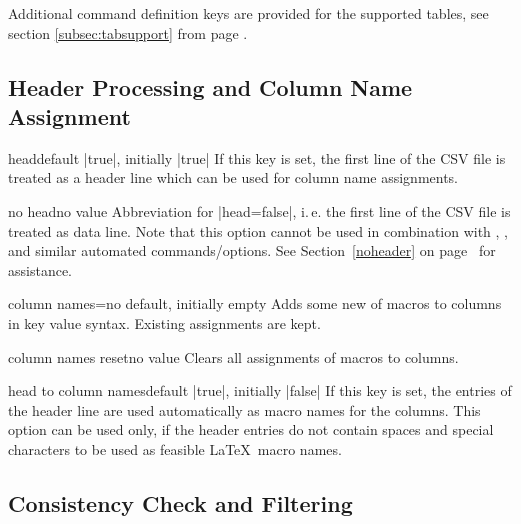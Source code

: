 \documentclass[a4paper,11pt]{ltxdoc}
\begin{document}
Additional command definition keys are provided for the supported tables,
see section \ref{subsec:tabsupport} from page
\pageref{subsec:tabsupport}.


\subsection{Header Processing and Column Name Assignment}%

\begin{docCsvKey}{head}{}{default |true|, initially |true|}
  If this key is set, the first line of the CSV file is treated as a header
  line which can be used for column name assignments.
\end{docCsvKey}


\begin{docCsvKey}{no head}{}{no value}
  Abbreviation for |head=false|, i.\,e. the first line of the CSV file is
  treated as data line.
  Note that this option cannot be used in combination with
  , , and similar automated commands/options.
  See Section~\ref{noheader} on page~\pageref{noheader} for assistance.
\end{docCsvKey}

\begin{docCsvKey}{column names}{=}{no default, initially empty}
  Adds some new  of macros to columns in key value syntax.
  Existing assignments are kept.
\end{docCsvKey}


\begin{docCsvKey}{column names reset}{}{no value}
  Clears all assignments of macros to columns.
\end{docCsvKey}


\begin{docCsvKey}{head to column names}{}{default |true|, initially |false|}
  If this key is set, the entries of the header line are used automatically
  as macro names for the columns. This option can be used only, if
  the header entries do not contain spaces and special characters to be
  used as feasible \LaTeX\ macro names.
\end{docCsvKey}


\clearpage
\subsection{Consistency Check and Filtering}%
\end{document}
